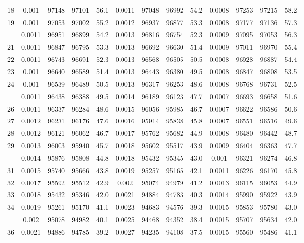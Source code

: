 \documentclass[
  14pt,
]{article}
\begin{document}
\begin{longtable}[t]{lcccccccccccc}
18 & 0.001 & 97148 & 97101 & 56.1 & 0.0011 & 97048 & 96992 & 54.2 & 0.0008 & 97253 & 97215 & 58.2\\
19 & 0.001 & 97053 & 97002 & 55.2 & 0.0012 & 96937 & 96877 & 53.3 & 0.0008 & 97177 & 97136 & 57.3\\
\addlinespace
20 & 0.0011 & 96951 & 96899 & 54.2 & 0.0013 & 96816 & 96754 & 52.3 & 0.0009 & 97095 & 97053 & 56.3\\
21 & 0.0011 & 96847 & 96795 & 53.3 & 0.0013 & 96692 & 96630 & 51.4 & 0.0009 & 97011 & 96970 & 55.4\\
22 & 0.0011 & 96743 & 96691 & 52.3 & 0.0013 & 96568 & 96505 & 50.5 & 0.0008 & 96928 & 96887 & 54.4\\
23 & 0.001 & 96640 & 96589 & 51.4 & 0.0013 & 96443 & 96380 & 49.5 & 0.0008 & 96847 & 96808 & 53.5\\
24 & 0.001 & 96539 & 96489 & 50.5 & 0.0013 & 96317 & 96253 & 48.6 & 0.0008 & 96768 & 96731 & 52.5\\
\addlinespace
25 & 0.0011 & 96438 & 96388 & 49.5 & 0.0014 & 96189 & 96123 & 47.7 & 0.0007 & 96693 & 96658 & 51.6\\
26 & 0.0011 & 96337 & 96284 & 48.6 & 0.0015 & 96056 & 95985 & 46.7 & 0.0007 & 96622 & 96586 & 50.6\\
27 & 0.0012 & 96231 & 96176 & 47.6 & 0.0016 & 95914 & 95838 & 45.8 & 0.0007 & 96551 & 96516 & 49.6\\
28 & 0.0012 & 96121 & 96062 & 46.7 & 0.0017 & 95762 & 95682 & 44.9 & 0.0008 & 96480 & 96442 & 48.7\\
29 & 0.0013 & 96003 & 95940 & 45.7 & 0.0018 & 95602 & 95517 & 43.9 & 0.0009 & 96404 & 96363 & 47.7\\
\addlinespace
30 & 0.0014 & 95876 & 95808 & 44.8 & 0.0018 & 95432 & 95345 & 43.0 & 0.001 & 96321 & 96274 & 46.8\\
31 & 0.0015 & 95740 & 95666 & 43.8 & 0.0019 & 95257 & 95165 & 42.1 & 0.0011 & 96226 & 96170 & 45.8\\
32 & 0.0017 & 95592 & 95512 & 42.9 & 0.002 & 95074 & 94979 & 41.2 & 0.0013 & 96115 & 96053 & 44.9\\
33 & 0.0018 & 95432 & 95346 & 42.0 & 0.0021 & 94884 & 94783 & 40.3 & 0.0014 & 95990 & 95922 & 43.9\\
34 & 0.0019 & 95261 & 95170 & 41.1 & 0.0023 & 94683 & 94576 & 39.3 & 0.0015 & 95853 & 95780 & 43.0\\
\addlinespace
35 & 0.002 & 95078 & 94982 & 40.1 & 0.0025 & 94468 & 94352 & 38.4 & 0.0015 & 95707 & 95634 & 42.0\\
36 & 0.0021 & 94886 & 94785 & 39.2 & 0.0027 & 94235 & 94108 & 37.5 & 0.0015 & 95560 & 95486 & 41.1\\

\end{longtable}
\end{document}
